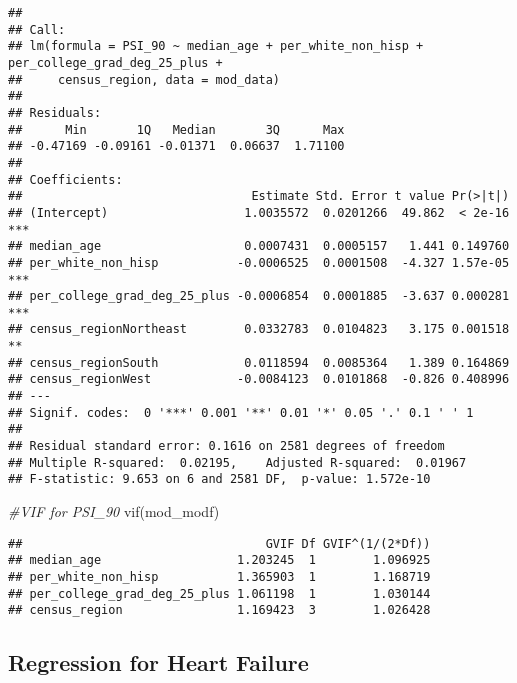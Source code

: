 \documentclass[
]{article}
\newenvironment{Shaded}{\begin{snugshade}}{\end{snugshade}}
\newcommand{\CommentTok}[1]{\textcolor[rgb]{0.56,0.35,0.01}{\textit{#1}}}
\newcommand{\FunctionTok}[1]{\textcolor[rgb]{0.00,0.00,0.00}{#1}}
\newcommand{\NormalTok}[1]{#1}
\begin{document}
\begin{verbatim}
## 
## Call:
## lm(formula = PSI_90 ~ median_age + per_white_non_hisp + per_college_grad_deg_25_plus + 
##     census_region, data = mod_data)
## 
## Residuals:
##      Min       1Q   Median       3Q      Max 
## -0.47169 -0.09161 -0.01371  0.06637  1.71100 
## 
## Coefficients:
##                                Estimate Std. Error t value Pr(>|t|)    
## (Intercept)                   1.0035572  0.0201266  49.862  < 2e-16 ***
## median_age                    0.0007431  0.0005157   1.441 0.149760    
## per_white_non_hisp           -0.0006525  0.0001508  -4.327 1.57e-05 ***
## per_college_grad_deg_25_plus -0.0006854  0.0001885  -3.637 0.000281 ***
## census_regionNortheast        0.0332783  0.0104823   3.175 0.001518 ** 
## census_regionSouth            0.0118594  0.0085364   1.389 0.164869    
## census_regionWest            -0.0084123  0.0101868  -0.826 0.408996    
## ---
## Signif. codes:  0 '***' 0.001 '**' 0.01 '*' 0.05 '.' 0.1 ' ' 1
## 
## Residual standard error: 0.1616 on 2581 degrees of freedom
## Multiple R-squared:  0.02195,    Adjusted R-squared:  0.01967 
## F-statistic: 9.653 on 6 and 2581 DF,  p-value: 1.572e-10
\end{verbatim}

\begin{Shaded}
\begin{Highlighting}[]
\CommentTok{\#VIF for PSI\_90 }
\FunctionTok{vif}\NormalTok{(mod\_modf)}
\end{Highlighting}
\end{Shaded}

\begin{verbatim}
##                                  GVIF Df GVIF^(1/(2*Df))
## median_age                   1.203245  1        1.096925
## per_white_non_hisp           1.365903  1        1.168719
## per_college_grad_deg_25_plus 1.061198  1        1.030144
## census_region                1.169423  3        1.026428
\end{verbatim}

\hypertarget{regression-for-heart-failure}{%
\subsection{Regression for Heart
Failure}\label{regression-for-heart-failure}}
\end{document}
